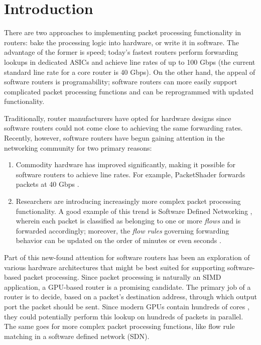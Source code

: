 \section{Introduction}

There are two approaches to implementing packet processing functionality in
routers: bake the processing logic into hardware, or write it in software. The
advantage of the former is speed; today's fastest routers perform forwarding
lookups in dedicated ASICs and achieve line rates of up to 100 Gbps (the
current standard line rate for a core router is 40 Gbps)\cite{Han}. On the
other hand, the appeal of software routers is programability; software routers
can more easily support complicated packet processing functions and can be
reprogrammed with updated functionality.

Traditionally, router manufacturers have opted for hardware designs since
software routers could not come close to achieving the same forwarding rates.
Recently, however, software routers have begun gaining attention in the
networking community for two primary reasons:
\begin{enumerate}
	\item Commodity hardware has improved significantly, making it possible for
	software routers to achieve line rates. For example, PacketShader forwards
	packets at 40 Gbps \cite{Han}.

	\item Researchers are introducing increasingly more complex packet
	processing functionality. A good example of this trend is Software Defined
	Networking \cite{OpenFlow}, wherein each packet is classified as belonging to
	one or more \emph{flows} and is forwarded accordingly; moreover, the
	\emph{flow rules} governing forwarding behavior can be updated on the order
	of minutes \cite{OpenFlow} or even seconds \cite{Jafarian}.
\end{enumerate}

Part of this new-found attention for software routers has been an exploration
of various hardware architectures that might be best suited for supporting
software-based packet processing. Since packet processing is naturally an SIMD
application, a GPU-based router is a promising candidate. The primary job of a
router is to decide, based on a packet's destination address, through which
output port the packet should be sent. Since modern GPUs contain hundreds of
cores \cite{Ryoo}, they could potentially perform this lookup on hundreds of
packets in parallel. The same goes for more complex packet processing
functions, like flow rule matching in a software defined network (SDN).

